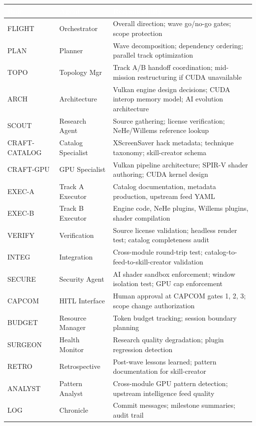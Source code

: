 \documentclass[11pt,letterpaper]{article}
\newcommand{\tableheader}[1]{\textbf{\sffamily\textcolor{white}{#1}}}
\begin{document}
\begin{center}
\begin{tabularx}{\textwidth}{L{2cm}L{3cm}X}
\toprule
{}
\tableheader{Role} & \tableheader{Agent} & \tableheader{Responsibility} \\
\midrule
FLIGHT & Orchestrator & Overall direction; wave go/no-go gates; scope protection \\
PLAN & Planner & Wave decomposition; dependency ordering; parallel track optimization \\
TOPO & Topology Mgr & Track A/B handoff coordination; mid-mission restructuring if CUDA unavailable \\
ARCH & Architecture & Vulkan engine design decisions; CUDA interop memory model; AI evolution architecture \\
SCOUT & Research Agent & Source gathering; license verification; NeHe/Willems reference lookup \\
CRAFT-CATALOG & Catalog Specialist & XScreenSaver hack metadata; technique taxonomy; skill-creator schema \\
CRAFT-GPU & GPU Specialist & Vulkan pipeline architecture; SPIR-V shader authoring; CUDA kernel design \\
EXEC-A & Track A Executor & Catalog documentation, metadata production, upstream feed YAML \\
EXEC-B & Track B Executor & Engine code, NeHe plugins, Willems plugins, shader compilation \\
VERIFY & Verification & Source license validation; headless render test; catalog completeness audit \\
INTEG & Integration & Cross-module round-trip test; catalog-to-feed-to-skill-creator validation \\
SECURE & Security Agent & AI shader sandbox enforcement; window isolation test; GPU cap enforcement \\
CAPCOM & HITL Interface & Human approval at CAPCOM gates 1, 2, 3; scope change authorization \\
BUDGET & Resource Manager & Token budget tracking; session boundary planning \\
SURGEON & Health Monitor & Research quality degradation; plugin regression detection \\
RETRO & Retrospective & Post-wave lessons learned; pattern documentation for skill-creator \\
ANALYST & Pattern Analyst & Cross-module GPU pattern detection; upstream intelligence feed quality \\
LOG & Chronicle & Commit messages; milestone summaries; audit trail \\
\bottomrule
\end{tabularx}
\end{center}
\end{document}
